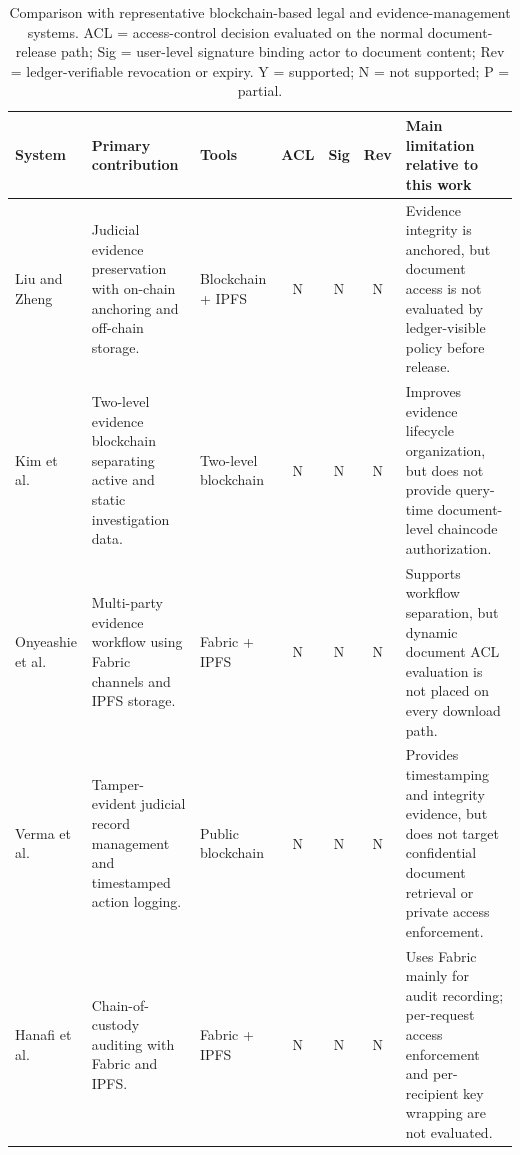 \documentclass{ieeeaccess}
\begin{document}
\begin{table}[!t]
\centering
\caption{Comparison with representative blockchain-based legal and evidence-management systems. 
ACL = access-control decision evaluated on the normal document-release path; 
Sig = user-level signature binding actor to document content; 
Rev = ledger-verifiable revocation or expiry. 
Y = supported; N = not supported; P = partial.}
\label{tab:literature_review}
\scriptsize
\renewcommand{\arraystretch}{1.18}
\setlength{\tabcolsep}{4pt}
\begin{tabularx}{\textwidth}{@{}
>{\raggedright\arraybackslash}p{2.3cm}
>{\raggedright\arraybackslash}p{3.3cm}
>{\raggedright\arraybackslash}p{2.2cm}
c c c
>{\raggedright\arraybackslash}X
@{}}
\toprule
\textbf{System} &
\textbf{Primary contribution} &
\textbf{Tools} &
\textbf{ACL} &
\textbf{Sig} &
\textbf{Rev} &
\textbf{Main limitation relative to this work} \\
\midrule

Liu and Zheng~\cite{liu2024blockchain} &
Judicial evidence preservation with on-chain anchoring and off-chain storage. &
Blockchain + IPFS &
N & N & N &
Evidence integrity is anchored, but document access is not evaluated by ledger-visible policy before release. \\

Kim et al.~\cite{twoLevelBlockchain} &
Two-level evidence blockchain separating active and static investigation data. &
Two-level blockchain &
N & N & N &
Improves evidence lifecycle organization, but does not provide query-time document-level chaincode authorization. \\

Onyeashie et al.~\cite{onyeashie2025fabricEvidence} &
Multi-party evidence workflow using Fabric channels and IPFS storage. &
Fabric + IPFS &
N & N & N &
Supports workflow separation, but dynamic document ACL evaluation is not placed on every download path. \\

Verma et al.~\cite{verma2021nyaya} &
Tamper-evident judicial record management and timestamped action logging. &
Public blockchain &
N & N & N &
Provides timestamping and integrity evidence, but does not target confidential document retrieval or private access enforcement. \\

Hanafi et al.~\cite{hanafi2021ipfschain} &
Chain-of-custody auditing with Fabric and IPFS. &
Fabric + IPFS &
N & N & N &
Uses Fabric mainly for audit recording; per-request access enforcement and per-recipient key wrapping are not evaluated. \\


\end{tabularx}
\end{table}
\end{document}
